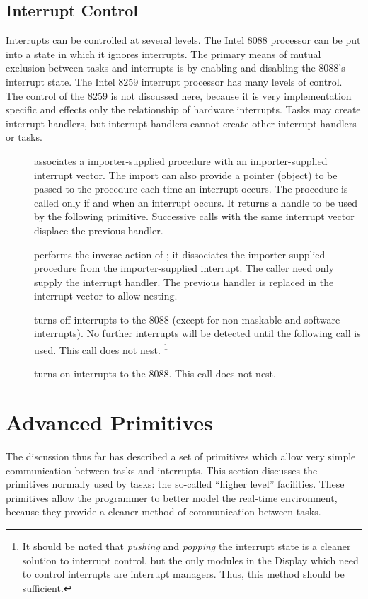 \subsection{Interrupt Control}
Interrupts can be controlled at several levels.  The Intel 8088 processor
can be put into a state in which it ignores interrupts.  The primary means
of mutual exclusion between tasks and interrupts is by enabling and
disabling the 8088's interrupt state.  The Intel 8259
interrupt processor has many levels of control.  The control of the 8259
is not discussed here, because it is very implementation specific and
effects only the relationship of hardware interrupts.  Tasks may
create interrupt handlers, but interrupt handlers cannot create other
interrupt handlers or tasks.
\begin{description}
\item[]
    associates a importer-supplied procedure with an importer-supplied
    interrupt vector.  The import can also provide a pointer (object)
    to be passed to the procedure each time an interrupt occurs.  The
    procedure is called only if and when an interrupt occurs.  It
    returns a handle to be used by the following primitive.  Successive
    calls with the same interrupt vector displace the previous handler.
\item[]
    performs the inverse action of ; it 
    dissociates
    the importer-supplied procedure from the importer-supplied interrupt.
    The caller need only supply the interrupt handler.  The previous
    handler is replaced in the interrupt vector to allow nesting.
\item[]
    turns off interrupts to the 8088 (except for non-maskable
    and software interrupts).  No further interrupts will be detected
    until the following call is used.  This call does not nest.
    \footnote{
	It should be noted that {\em pushing} and {\em popping} the
	interrupt state is a cleaner solution to interrupt control, but
	the only modules in the Display which need to control interrupts
	are interrupt managers. Thus, this method should be sufficient.}
\item[]
    turns on interrupts to the 8088.  This call does not nest.
\end{description}

\section{Advanced Primitives}
\label{sec-adv}
The discussion thus far has described a set of primitives which allow
very simple communication between tasks and interrupts. 
This section discusses the primitives normally used by tasks:
the so-called ``higher level'' facilities.  These primitives allow
the programmer to better model the real-time environment, because they
provide a cleaner method of communication between tasks.

